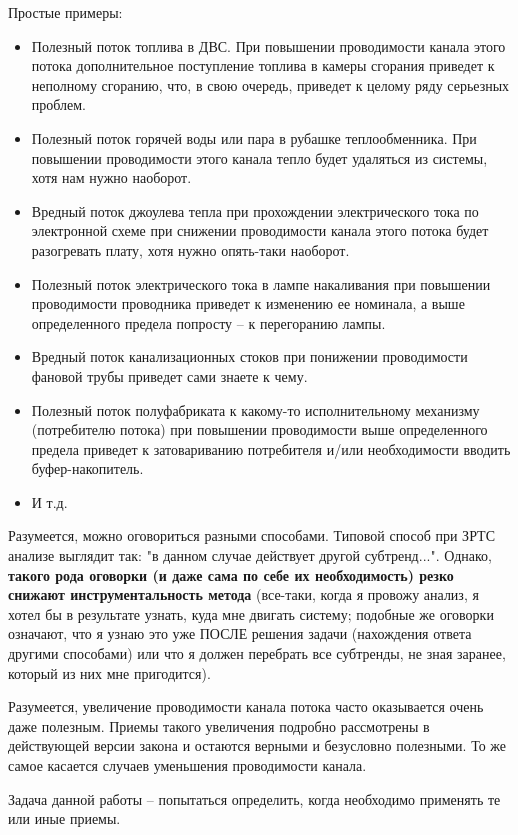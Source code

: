 \documentclass[a4paper,11pt]{article}
\begin{document}
Простые примеры:
\begin{itemize}
\item Полезный поток топлива в ДВС. При повышении проводимости канала этого
  потока дополнительное поступление топлива в камеры сгорания приведет к
  неполному сгоранию, что, в свою очередь, приведет к целому ряду серьезных
  проблем.
\item Полезный поток горячей воды или пара в рубашке теплообменника. При
  повышении проводимости этого канала тепло будет удаляться из системы, хотя
  нам нужно наоборот.
\item Вредный поток джоулева тепла при прохождении электрического тока по
  электронной схеме при снижении проводимости канала этого потока будет
  разогревать плату, хотя нужно опять-таки наоборот.
\item Полезный поток электрического тока в лампе накаливания при повышении
  проводимости проводника приведет к изменению ее номинала, а выше
  определенного предела попросту -- к перегоранию лампы.
\item Вредный поток канализационных стоков при понижении проводимости фановой
  трубы приведет сами знаете к чему.
\item Полезный поток полуфабриката к какому-то исполнительному механизму
  (потребителю потока) при повышении проводимости выше определенного предела
  приведет к затовариванию потребителя и/или необходимости вводить
  буфер-накопитель.
\item И т.д.
\end{itemize}
Разумеется, можно оговориться разными способами. Типовой способ при ЗРТС
анализе выглядит так: "в данном случае действует другой субтренд...". Однако,
\textbf{такого рода оговорки (и даже сама по себе их необходимость) резко
  снижают инструментальность метода} (все-таки, когда я провожу анализ, я
хотел бы в результате узнать, куда мне двигать систему; подобные же оговорки
означают, что я узнаю это уже ПОСЛЕ решения задачи (нахождения ответа другими
способами) или что я должен перебрать все субтренды, не зная заранее, который
из них мне пригодится).

Разумеется, увеличение проводимости канала потока часто оказывается очень даже
полезным. Приемы такого увеличения подробно рассмотрены в действующей версии
закона и остаются верными и безусловно полезными. То же самое касается случаев
уменьшения проводимости канала.

Задача данной работы -- попытаться определить, когда необходимо применять те
или иные приемы.
\end{document}
